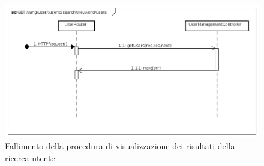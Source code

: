 \begin{itemize}
\begin{figure}[ht]
	\centering
	\includegraphics[scale=0.45]{UML/DiagrammiDiSequenza/Back-end/GET__lang_user__userId_search__keyword_users_failure.png}
	\caption{Fallimento della procedura di visualizzazione dei risultati della ricerca utente}
\end{figure}
\FloatBarrier

\end{itemize}






